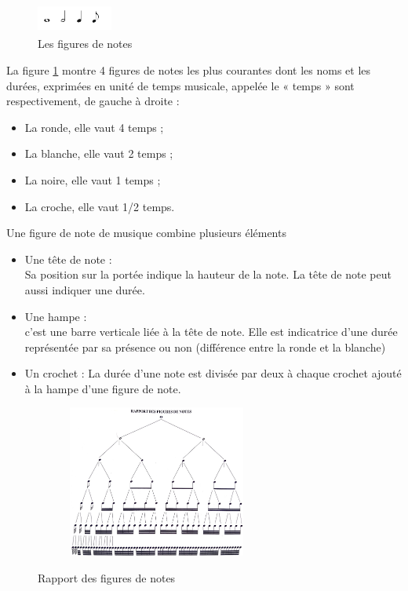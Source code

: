 \begin{figure}[h]
	\centering
	\includegraphics[height=10mm, width=25mm]{
    z_images/3_methodes/0_notation_de_la_batterie/0_figures_de_notes.png}
    \caption{Les figures de notes}
    \label{4_notes}
\end{figure}
La figure \ref{4_notes} montre 4 figures de notes les plus courantes dont les
noms et les durées, exprimées en unité de temps musicale, appelée le « temps »
sont respectivement, de gauche à droite :
\begin{itemize}
    \item La ronde, elle vaut 4 temps ;
    \item La blanche, elle vaut 2 temps ;
    \item La noire, elle vaut 1 temps ;
    \item La croche, elle vaut 1/2 temps.
\end{itemize}
Une figure de note \cite{danhauser} de musique combine plusieurs éléments
\cite{gould2016behind}
\begin{itemize}
	\item Une tête de note :\\
	Sa position sur la portée indique la hauteur de la note. La tête de note
    peut aussi indiquer une durée.
	\item Une hampe :\\
	c’est une barre verticale liée à la tête de note. Elle est indicatrice
    d’une durée représentée par sa présence ou non (différence entre la ronde
    et la blanche)
	\item Un crochet : La durée d’une note est divisée par deux à chaque
     crochet ajouté à la hampe d’une figure de note.\\
\end{itemize}
\begin{figure}[h]
	\centering
	\includegraphics[height=50mm, width=80mm]{
    z_images/3_methodes/0_notation_de_la_batterie/1_rapport_figures_notes.png}
	\caption{Rapport des figures de notes}\cite{danhauser}
	\label{rapp_fig_notes}
\end{figure}

